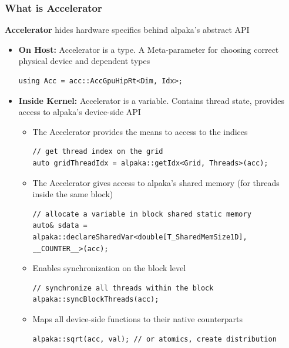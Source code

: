 \documentclass[9pt]{beamer}
\begin{document}
\begin{frame} [fragile]
\frametitle{What is Accelerator}
\textbf{Accelerator} hides hardware specifics behind alpaka’s abstract API
\lstset{basicstyle=\ttfamily\scriptsize}
\begin{itemize}
\item \textbf{On Host:} Accelerator is a type. A Meta-parameter for choosing correct physical device and dependent types
\begin{lstlisting}
using Acc = acc::AccGpuHipRt<Dim, Idx>;
 \end{lstlisting}
\item \textbf{Inside Kernel:} Accelerator is a variable. Contains thread state, provides access to alpaka’s device-side API
\begin{itemize}
\item The Accelerator provides the means to access to the indices
 \begin{lstlisting}
// get thread index on the grid
auto gridThreadIdx = alpaka::getIdx<Grid, Threads>(acc);
 \end{lstlisting}
\item The Accelerator gives access to alpaka’s shared memory (for threads inside the same block)
 \begin{lstlisting}
// allocate a variable in block shared static memory
auto& sdata = alpaka::declareSharedVar<double[T_SharedMemSize1D], __COUNTER__>(acc);
 \end{lstlisting}
\item Enables synchronization on the block level
 \begin{lstlisting}
// synchronize all threads within the block
alpaka::syncBlockThreads(acc);
 \end{lstlisting}
 \item Maps all device-side functions to their native counterparts
 \begin{lstlisting}
alpaka::sqrt(acc, val); // or atomics, create distribution
 \end{lstlisting}
\end{itemize}
\end{itemize}

\end{frame}
\end{document}
